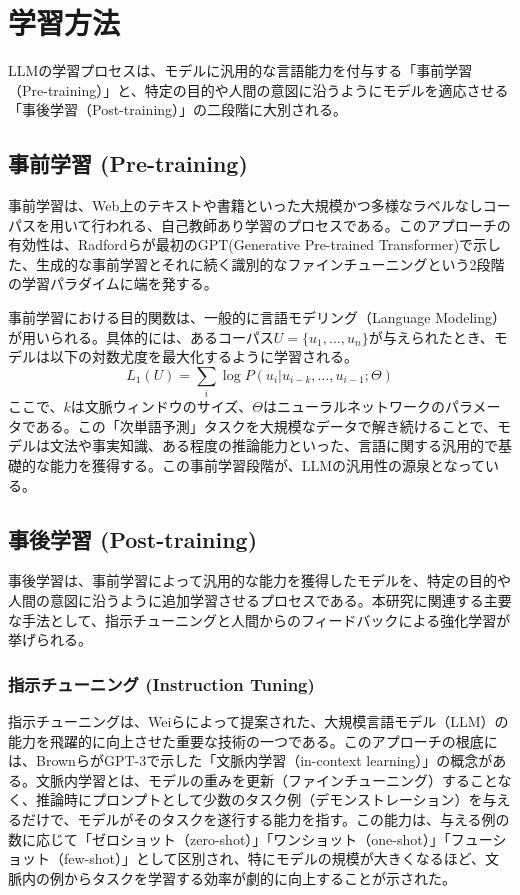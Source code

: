 \documentclass[a4paper,11pt]{jreport}
\begin{document}
\section{学習方法}
LLMの学習プロセスは、モデルに汎用的な言語能力を付与する「事前学習（Pre-training）」と、特定の目的や人間の意図に沿うようにモデルを適応させる「事後学習（Post-training）」の二段階に大別される。

\subsection{事前学習 (Pre-training)}
事前学習は、Web上のテキストや書籍といった大規模かつ多様なラベルなしコーパスを用いて行われる、自己教師あり学習のプロセスである。このアプローチの有効性は、Radfordらが最初のGPT(Generative Pre-trained Transformer)で示した\cite{GPT-1}、生成的な事前学習とそれに続く識別的なファインチューニングという2段階の学習パラダイムに端を発する。

事前学習における目的関数は、一般的に言語モデリング（Language Modeling）が用いられる。具体的には、あるコーパス$U = \{u_1, \dots, u_n\}$が与えられたとき、モデルは以下の対数尤度を最大化するように学習される。
$$
L_1(U) = \sum_i \log P(u_i | u_{i-k}, \dots, u_{i-1}; \Theta)
$$
ここで、$k$は文脈ウィンドウのサイズ、$\Theta$はニューラルネットワークのパラメータである。この「次単語予測」タスクを大規模なデータで解き続けることで、モデルは文法や事実知識、ある程度の推論能力といった、言語に関する汎用的で基礎的な能力を獲得する。この事前学習段階が、LLMの汎用性の源泉となっている。

\subsection{事後学習 (Post-training)}
事後学習は、事前学習によって汎用的な能力を獲得したモデルを、特定の目的や人間の意図に沿うように追加学習させるプロセスである。本研究に関連する主要な手法として、指示チューニングと人間からのフィードバックによる強化学習が挙げられる。

\subsubsection{指示チューニング (Instruction Tuning)}
指示チューニングは、Weiらによって提案された\cite{Instruction-Tuning}、大規模言語モデル（LLM）の能力を飛躍的に向上させた重要な技術の一つである。このアプローチの根底には、BrownらがGPT-3で示した「文脈内学習（in-context learning）」の概念がある\cite{GPT-3}。文脈内学習とは、モデルの重みを更新（ファインチューニング）することなく、推論時にプロンプトとして少数のタスク例（デモンストレーション）を与えるだけで、モデルがそのタスクを遂行する能力を指す。この能力は、与える例の数に応じて「ゼロショット（zero-shot）」「ワンショット（one-shot）」「フューショット（few-shot）」として区別され、特にモデルの規模が大きくなるほど、文脈内の例からタスクを学習する効率が劇的に向上することが示された。
\end{document}
